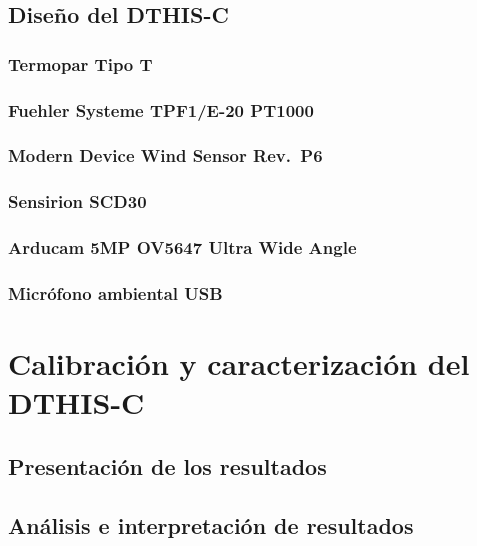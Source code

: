 \documentclass[
  letterpaper,
  DIV=11,
  numbers=noendperiod]{scrreprt}
\begin{document}
\section{Diseño del DTHIS-C}\label{diseuxf1o-del-dthis-c}

\subsection{Termopar Tipo T}\label{termopar-tipo-t}

\subsection{Fuehler Systeme TPF1/E-20
PT1000}\label{fuehler-systeme-tpf1e-20-pt1000}

\subsection{Modern Device Wind Sensor
Rev.~P6}\label{modern-device-wind-sensor-rev.-p6}

\subsection{Sensirion SCD30}\label{sensirion-scd30}

\subsection{Arducam 5MP OV5647 Ultra Wide
Angle}\label{arducam-5mp-ov5647-ultra-wide-angle}

\subsection{Micrófono ambiental USB}\label{micruxf3fono-ambiental-usb}


\chapter{Calibración y caracterización del
DTHIS-C}\label{calibraciuxf3n-y-caracterizaciuxf3n-del-dthis-c}

\section{Presentación de los
resultados}\label{presentaciuxf3n-de-los-resultados}

\section{Análisis e interpretación de
resultados}\label{anuxe1lisis-e-interpretaciuxf3n-de-resultados}
\end{document}
